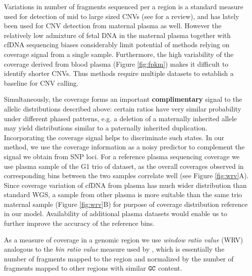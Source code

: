 \begin{figure}
{\begin{minipage}[b]{0.48\textwidth}
	\end{minipage}	
}
\end{figure}

Variations in number of fragments sequenced per a region is a standard measure used for detection of mid to large sized CNVs (see \cite{medvedev2009} for a review), and has lately been used for CNV detection from maternal plasma \citep{srinivasan2013, chen2013} as well. However the relatively low admixture of fetal DNA in the maternal plasma together with cfDNA sequencing biases considerably limit potential of methods relying on coverage signal from a single sample. Furthermore, the high variability of the coverage derived from blood plasma (Figure \ref{fig:fpkm}) makes it difficult to identify shorter CNVs. Thus methods \cite{srinivasan2013, chen2013} require multiple datasets to establish a baseline for CNV calling.

Simultaneously, the coverage forms an important \textbf{complimentary} signal to the allelic distributions described above: certain ratios have very similar probability under different phased patterns, e.g. a deletion of a maternally inherited allele may yield distributions similar to a paternally inherited duplication. Incorporating the coverage signal helps to discriminate such states. In our method, we use the coverage information as a noisy predictor to complement the signal we obtain from SNP loci. For a reference plasma sequencing coverage we use plasma sample of the G1 trio of \cite{kitzman2012} dataset, as the overall coverages observed in corresponding bins between the two samples correlate well (see Figure \ref{fig:wrv}A). Since coverage variation of cfDNA from plasma has much wider distribution than standard WGS, a sample from other plasma is more suitable than the same trio maternal sample (Figure \ref{fig:wrv}B) for purpose of coverage distribution reference in our model. Availability of additional plasma datasets would enable us to further improve the accuracy of the reference bins.

As a measure of coverage in a genomic region we use \emph{window ratio value} (WRV) analogous to the \emph{bin ratio value} measure used by \cite{srinivasan2013}, which is essentially the number of fragments mapped to the region and normalized by the number of fragments mapped to other regions with similar $\texttt{G}\texttt{C}$ content.

